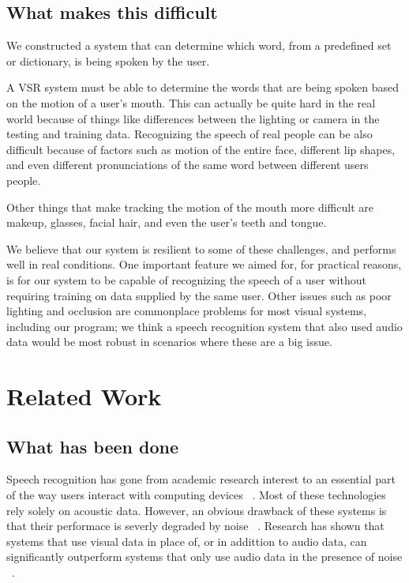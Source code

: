 \documentclass[10pt,twocolumn,letterpaper]{article}
\begin{document}
\subsection{What makes this difficult}
We constructed a system that can determine which word, from a predefined set or dictionary, is being spoken by the user.

A VSR system must be able to determine the words that are being spoken based on the motion of a user's mouth. This can actually be quite hard in the real world because of things like differences between the lighting or camera in the testing and training data. Recognizing the speech of real people can be also difficult because of factors such as motion of the entire face, different lip shapes, and even different pronunciations of the same word between different users people.

Other things that make tracking the motion of the mouth more difficult are makeup, glasses, facial hair, and even the user's teeth and tongue.

We believe that our system is resilient to some of these challenges, and performs well in real conditions. One important feature we aimed for, for practical reasons, is for our system to be capable of recognizing the speech of a user without requiring training on data supplied by the same user.
Other issues such as poor lighting and occlusion are commonplace problems for most visual systems, including our program; we think a speech recognition system that also used audio data would be most robust in scenarios where these are a big issue.



\section{Related Work}
\subsection{What has been done}
Speech recognition has gone from academic research interest to an essential part of the way users interact with computing devices ~\cite{Lison:2014:SDS:2677339.2659891}.
Most of these technologies rely solely on acoustic data. However, an obvious drawback of these systems is that their performace is severly degraded by noise ~\cite{Cooke2001267}. Research has shown that systems that use visual data in place of, or in addittion to audio data, can significantly outperform systems that only use audio data in the presence of noise ~\cite{Lison:2014:SDS:2677339.2659891}.
\end{document}
